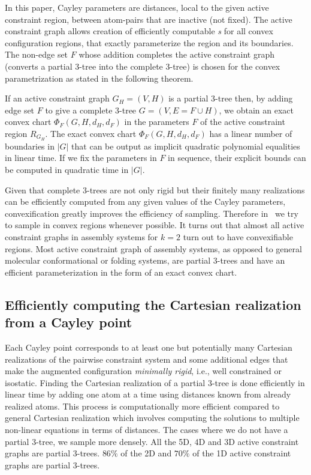In this paper, Cayley parameters are distances, local to the given active constraint
region, between atom-pairs that are inactive (not fixed). The active
constraint graph allows creation of efficiently computable \textit{\chart s}
for all convex configuration regions, that exactly parameterize the region and
its boundaries. The non-edge set $F$ whose addition completes the active
constraint graph (converts a partial 3-tree into the complete 3-tree) is chosen
for the convex parametrization as stated in the following theorem.

\begin{theorem}
If an active constraint graph $G_H = (V, H)$ is a partial 3-tree then, by
adding edge set $F$ to give a complete 3-tree $G = (V, E = F \cup H)$, we
obtain an exact convex chart $\Phi_F (G, H, d_H , d_F)$ in the parameters $F$
of the active constraint region $R_{G_H}$. The exact convex chart $\Phi_F (G,
H, d_H , d_F)$ has a linear number of boundaries in $|G|$ that can be output as
implicit quadratic polynomial equalities in linear time. If we fix the
parameters in $F$ in sequence, their explicit bounds can be computed in
quadratic time in $|G|$.
\end{theorem}


Given that complete 3-trees are not only rigid but their finitely many
realizations can be efficiently computed from any given values of the Cayley
parameters, convexification greatly improves the efficiency of sampling.
Therefore in \EASAL~we try to sample in convex regions whenever possible. It
turns out that almost all active constraint graphs in assembly systems for $k =
2$ turn out to have convexifiable regions. Most active constraint graph of
assembly systems, as opposed to general molecular conformational or folding
systems, are partial 3-trees and have an efficient parameterization in the form
of an exact convex chart.


\subsection{Efficiently computing the Cartesian realization from a Cayley
point} Each Cayley point corresponds to at least one but potentially many
Cartesian realizations of the pairwise constraint system and some additional
edges that make the augmented configuration \emph{minimally rigid}, i.e., well
constrained or isostatic. Finding the Cartesian realization of a partial 3-tree
is done efficiently in linear time by adding one atom at a time using distances
known from already realized atoms. This process is computationally more
efficient compared to general Cartesian realization which involves computing
the solutions to multiple non-linear equations in terms of distances. The cases
where we do not have a partial 3-tree, we sample more densely. All the 5D, 4D
and 3D active constraint graphs are partial 3-trees. $86\%$ of the 2D and
$70\%$ of the 1D active constraint graphs are partial 3-trees.


